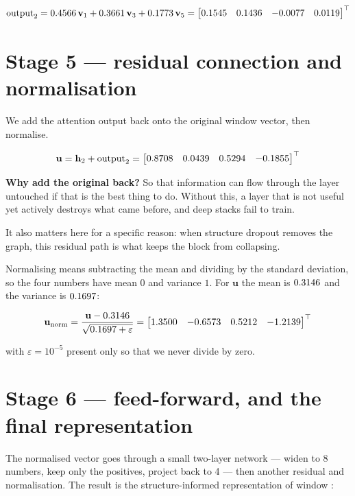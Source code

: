 \documentclass[11pt,a4paper]{article}
\newcommand{\hvec}[1]{\mathbf{h}_{#1}}
\newcommand{\vvec}[1]{\mathbf{v}_{#1}}
\begin{document}
\[
\text{output}_{\WEfocus}
= \WEattnOne\,\vvec{1} + \WEattnThree\,\vvec{3} + \WEattnFive\,\vvec{5}
= \begin{bmatrix}
\WEattnoutZero & \WEattnoutOne & \WEattnoutTwo & \WEattnoutThree
\end{bmatrix}^\top
\]

\section{Stage 5 --- residual connection and normalisation}

We add the attention output back onto the original window vector, then normalise.

\[
\mathbf{u} = \hvec{\WEfocus} + \text{output}_{\WEfocus}
= \begin{bmatrix} \WEuZero & \WEuOne & \WEuTwo & \WEuThree \end{bmatrix}^\top
\]

\begin{plainbox}
\textbf{Why add the original back?} So that information can flow through the
layer untouched if that is the best thing to do. Without this, a layer that is
not useful yet actively destroys what came before, and deep stacks fail to train.

It also matters here for a specific reason: when structure dropout removes the
graph, this residual path is what keeps the block from collapsing.
\end{plainbox}

Normalising means subtracting the mean and dividing by the standard deviation, so
the four numbers have mean $0$ and variance $1$. For $\mathbf{u}$ the mean is
$0.3146$ and the variance is $0.1697$:

\[
\mathbf{u}_{\text{norm}}
= \frac{\mathbf{u} - 0.3146}{\sqrt{0.1697 + \varepsilon}}
= \begin{bmatrix} 1.3500 & -0.6573 & 0.5212 & -1.2139 \end{bmatrix}^\top
\]

with $\varepsilon = 10^{-5}$ present only so that we never divide by zero.

\section{Stage 6 --- feed-forward, and the final representation}

The normalised vector goes through a small two-layer network --- widen to 8
numbers, keep only the positives, project back to 4 --- then another residual and
normalisation. The result is the structure-informed representation of window
\WEfocus{}:
\end{document}
